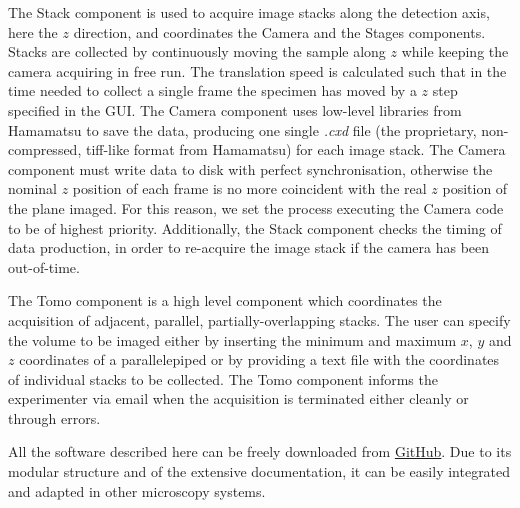\documentclass[12pt]{spieman}  %
\begin{document}
The Stack component is used to acquire image stacks along the detection axis, here the $z$ direction, and coordinates the Camera and the Stages components. Stacks are collected by continuously moving the sample along $z$ while keeping the camera acquiring in free run. The translation speed is calculated such that in the time needed to collect a single frame the specimen has moved by a $z$ step specified in the GUI. The Camera component uses low-level libraries from Hamamatsu to save the data, producing one single \emph{.cxd} file (the proprietary, non-compressed, tiff-like format from Hamamatsu) for each image stack. The Camera component must write data to disk with perfect synchronisation, otherwise the nominal $z$ position of each frame is no more coincident with the real $z$ position of the plane imaged. For this reason, we set the process executing the Camera code to be of highest priority. Additionally, the Stack component checks the timing of data production, in order to re-acquire the image stack if the camera has been out-of-time. %

The Tomo component is a high level component which coordinates the acquisition of adjacent, parallel, partially-overlapping stacks. %
The user can specify the volume to be imaged either by inserting the minimum and maximum $x$, $y$ and $z$ coordinates of a parallelepiped or by providing a text file with the coordinates of individual stacks to be collected. The Tomo component informs the experimenter via email when the acquisition is terminated either cleanly or through errors.

All the software described here can be freely downloaded from \href{https://github.com/marcelvanthoff/Giorgio}{GitHub}. Due to its modular structure and of the extensive documentation, it can be easily integrated and adapted in other microscopy systems.
\end{document}
